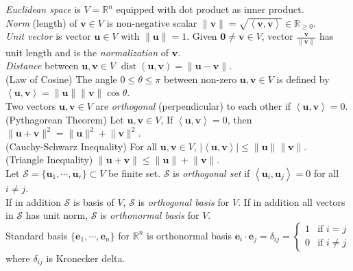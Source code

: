 \documentclass{article}
\theoremstyle{definition}
\DeclareMathOperator{\dist}{dist}
\begin{document}
\textit{Euclidean space} is $V=\mathbb{R}^{n}$ equipped with dot product as inner product.\\
\textit{Norm} (length) of $\mathbf{v}\in V$ is non-negative scalar $\lVert\mathbf{v}\rVert=\sqrt{\left<\mathbf{v},\mathbf{v}\right>}\in\mathbb{R}_{\geq 0}$.\\
\textit{Unit vector} is vector $\mathbf{u}\in V$ with $\lVert\mathbf{u}\rVert=1$. Given $\mathbf{0}\neq\mathbf{v}\in V$, vector $\frac{\mathbf{v}}{\lVert\mathbf{v}\rVert}$ has unit length and is the \textit{normalization} of $\mathbf{v}$.\\
\textit{Distance} between $\mathbf{u},\mathbf{v}\in V$ $\dist(\mathbf{u},\mathbf{v})=\lVert\mathbf{u}-\mathbf{v}\rVert$.\\
(Law of Cosine) The angle $0\leq\theta\leq\pi$ between non-zero $\mathbf{u},\mathbf{v}\in V$ is defined by $\left<\mathbf{u},\mathbf{v}\right>=\lVert\mathbf{u}\rVert\lVert\mathbf{v}\rVert\cos\theta$.\\
Two vectors $\mathbf{u},\mathbf{v}\in V$ are \textit{orthogonal} (perpendicular) to each other if $\left<\mathbf{u},\mathbf{v}\right>=0$.\\
(Pythagorean Theorem) Let $\mathbf{u},\mathbf{v}\in V$, If $\left<\mathbf{u},\mathbf{v}\right>=0$, then $\lVert\mathbf{u}+\mathbf{v}\rVert^{2}=\lVert\mathbf{u}\rVert^{2}+\lVert\mathbf{v}\rVert^{2}$.\\
(Cauchy-Schwarz Inequality) For all $\mathbf{u},\mathbf{v}\in V$, $\left|\left<\mathbf{u},\mathbf{v}\right>\right|\leq\lVert\mathbf{u}\rVert\lVert\mathbf{v}\rVert$.\\
(Triangle Inequality) $\lVert\mathbf{u}+\mathbf{v}\rVert\leq\lVert\mathbf{u}\rVert+\lVert\mathbf{v}\rVert$.\\
Let $\mathcal{S}=\{\mathbf{u}_{1},\cdots,\mathbf{u}_{r}\}\subset V$ be finite set. $\mathcal{S}$ is \textit{orthogonal set} if $\left<\mathbf{u}_{i},\mathbf{u}_{j}\right>=0$ for all $i\neq j$.\\
If in addition $\mathcal{S}$ is basis of $V$, $\mathcal{S}$ is \textit{orthogonal basis} for $V$. If in addition all vectors in $\mathcal{S}$ has unit norm, $\mathcal{S}$ is \textit{orthonormal basis} for $V$.\\
Standard basis $\{\mathbf{e}_{1},\cdots,\mathbf{e}_{n}\}$ for $\mathbb{R}^{n}$ is orthonormal basis $\mathbf{e}_{i}\cdot\mathbf{e}_{j}=\delta_{ij}=\begin{cases}
    1 &\text{if }i=j\\
    0 &\text{if }i\neq j
\end{cases}$ where $\delta_{ij}$ is Kronecker delta.\\
\end{document}

